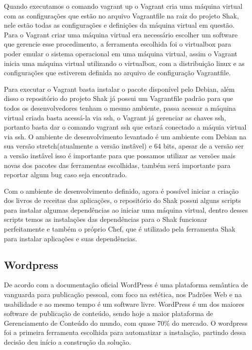 Quando executamos o comando vagrant up o Vagrant cria uma máquina virtual com as
configurações que estão no arquivo Vagrantfile na raiz do projeto Shak, nele
estão todas as configurações e definições da máquina virtual em questão. Para o
Vagrant criar uma máquina virtual era necessário escolher um software que gerencie
esse procedimento, a ferramenta escolhida foi o virtualbox para poder emular o sistema
operacional em uma máquina virtual, assim o Vagrant inicia uma máquina virtual
utilizando o virtualbox, com a distribuição linux e as configurações que estiverem
definida no arquivo de configuração Vagrantfile.

Para executar o Vagrant basta instalar o pacote disponível pelo Debian, além disso
o repositório do projeto Shak já possui um Vagrantfile padrão para que todos os
desenvolvedores tenham o mesmo ambiente, passa acessar a máquina virtual criada
basta acessá-la via ssh, o Vagrant já gerenciar as chaves ssh, portanto basta
dar o comando vagrant ssh que estará conectado a máquia virtual via ssh.
O ambiente de desenvolvimento levantado é um ambiente com Debian na sua versão
stretch(atualmente a versão instâvel) e 64 bits, apesar de a versão ser a versão
instâvel isso é importante para que possamos utilizar as versões mais novas dos
pacotes das ferramentas escolhidas, também será importante para reportar algum
bug caso seja encontrado.

Com o ambiente de desenvolvimento definido, agora é possível iniciar a criação dos
livros de receitas das aplicações, o repositório do Shak possui alguns scripts
para instalar algumas dependências ao iniciar uma máquina virtual, dentro
desses scripts temos as instalações das dependências para o Shak funcionar perfeitamente
e também o próprio Chef, que é utilizado pela ferramenta Shak para instalar aplicações e suas dependências.

\subsection{Wordpress}
\label{sub:wordpress}

De acordo com a documentação oficial \cite{wordpress} WordPress é uma plataforma
semântica de vanguarda para publicação pessoal, com foco na estética, nos
Padrões Web e na usabilidade e ao mesmo tempo é um software livre. WordPress é
um dos maiores software de publicação de conteúdo, sendo hoje a maior
plataforma de Gerenciamento de Conteúdo do mundo, com quase 70\% do mercado. O
wordpress foi a primeira ferramenta escolhida para automatizar a instalação, partindo
dessa decisão deu início a construção da solução.

